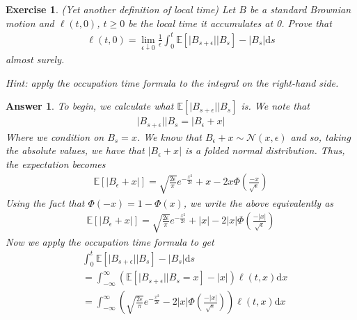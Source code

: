 \documentclass[12pt]{article}
\theoremstyle{colon}
\newtheorem{exercise}{Exercise}
\newtheorem*{answer}{Answer}
\begin{document}
\clearpage

\begin{exercise}
  (Yet another definition of local time) Let $B$ be a standard Brownian motion and $\ell(t,0)$, $t \geq 0$ be the local time it accumulates at 0. Prove that
  \begin{gather*}
    \ell(t,0) = \lim_{\epsilon \downarrow 0} \frac{1}{\epsilon} \int_0^t  \mathbb{E}[\lvert B_{s+\epsilon} \rvert | B_s ] - \lvert B_s \rvert \text{d}s
  \end{gather*}
  almost surely.

  \textit{Hint:} apply the occupation time formula to the integral on the right-hand side.
\end{exercise}

\begin{answer}
  To begin, we calculate what $\mathbb{E}[\lvert B_{s+\epsilon} \rvert | B_s ]$ is. We note that
  \begin{gather*}
    \lvert B_{s+\epsilon} \rvert | B_s = \lvert B_\epsilon + x \rvert
  \end{gather*}
  Where we condition on $B_s = x$. We know that $B_\epsilon + x \sim \mathcal{N}(x, \epsilon)$ and so, taking the absolute values, we have that $\lvert B_\epsilon + x \rvert$ is a folded normal distribution. Thus, the expectation becomes
  \begin{gather*}
    \mathbb{E}[\lvert B_\epsilon + x \rvert] = \sqrt{\frac{2 \epsilon}{\pi}} e^{-\frac{x^2}{2 \epsilon}} + x - 2 x \Phi\left(\frac{-x}{\sqrt{\epsilon}} \right)
  \end{gather*}
  Using the fact that $\Phi(-x) = 1 - \Phi(x)$, we write the above equivalently as
  \begin{gather*}
    \mathbb{E}[\lvert B_\epsilon + x \rvert] = \sqrt{\frac{2 \epsilon}{\pi}} e^{-\frac{x^2}{2 \epsilon}} + \lvert x \rvert  - 2 \lvert x \rvert \Phi\left(\frac{-\lvert x \rvert }{\sqrt{\epsilon}}\right)
  \end{gather*}
  Now we apply the occupation time formula to get
  \begin{align*}
    &\int_0^t  \mathbb{E}[\lvert B_{s+\epsilon} \rvert | B_s ] - \lvert B_s \rvert \text{d}s \\
    &= \int_{-\infty}^\infty \left(\mathbb{E}[\lvert B_{s+\epsilon} \rvert | B_s = x ] - \lvert x \rvert \right) \ell(t,x) \text{d}x \\
    &= \int_{-\infty}^\infty \left(\sqrt{\frac{2 \epsilon}{\pi}} e^{-\frac{x^2}{2 \epsilon}}  - 2 \lvert x \rvert \Phi\left(\frac{-\lvert x \rvert }{\sqrt{\epsilon}}\right) \right) \ell(t,x) \text{d}x

\end{align*}
\end{answer}
\end{document}
